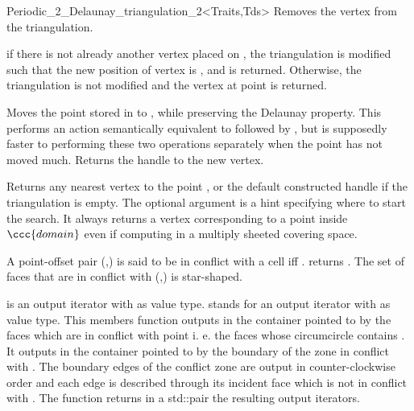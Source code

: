 \begin{ccRefClass}{Periodic_2_Delaunay_triangulation_2<Traits,Tds>}
%
{Removes the vertex from the triangulation.}


%
{if there is not already another vertex placed on , the
  triangulation is modified such that the new position of vertex
   is , and  is returned. Otherwise, the
  triangulation is not modified and the vertex at point  is
  returned. }

{Moves the point stored in  to , while preserving the
  Delaunay property.  This performs an action semantically equivalent
  to  followed by , but is supposedly
  faster to performing these two operations separately when the point
  has not moved much.  Returns the handle to the new vertex.
  }

\ccThreeToTwo

{Returns any nearest vertex to the point , or the default constructed
handle if the triangulation is empty.  The optional argument  is a hint
specifying where to start the search. It always returns a vertex
corresponding to a point inside $\ccc{domain}$ even if computing in a
multiply sheeted covering space.
}

A point-offset pair (,) is said to be in conflict with
a cell  iff \ccVar. returns
.  The set of faces that are in conflict with
(,) is star-shaped.

%
{  is an output iterator with  as
  value type.   stands for an output
  iterator with  as value type.  This members function
  outputs in the container pointed to by  the faces which are
  in conflict with point  i. e. the faces whose circumcircle
  contains .  It outputs in the container pointed to by
   the boundary of the zone in conflict with .
  The boundary edges of the conflict zone are output in
  counter-clockwise order and each edge is described through its
  incident face which is not in conflict with .  The function
  returns in a std::pair the resulting output
  iterators. }


\end{ccRefClass}
